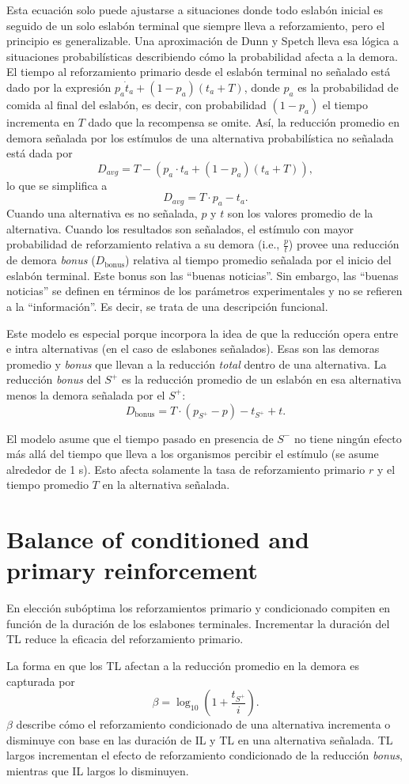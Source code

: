 \documentclass[a4paper,12pt]{article}
\begin{document}
Esta ecuación solo puede ajustarse a situaciones donde todo eslabón inicial es seguido de un solo eslabón terminal que siempre lleva a reforzamiento, pero el principio es generalizable.
Una aproximación de Dunn y Spetch lleva esa lógica a situaciones probabilísticas describiendo cómo la probabilidad afecta a la demora.
El tiempo al reforzamiento primario desde el eslabón terminal no señalado está dado por la expresión $p_{a} \dot t_{a} + (1 - p_{a})(t_{a} + T)$, donde $p_{a}$ es la probabilidad de comida al final del eslabón, es decir, con probabilidad $(1 - p_{a})$ el tiempo incrementa en $T$ dado que la recompensa se omite.
Así, la reducción promedio en demora señalada por los estímulos de una alternativa probabilística no señalada está dada por
\[
D_{avg} = T - (p_{a} \cdot t_{a} + (1 - p_{a})(t_{a} + T))
,\]
lo que se simplifica a
\[
D_{avg} = T \cdot p_{a} - t_{a}
.\]
Cuando una alternativa es no señalada, $p$ y $t$ son los valores promedio de la alternativa.
Cuando los resultados son señalados, el estímulo con mayor probabilidad de reforzamiento relativa a su demora (i.e., $\frac{p}{t}$) provee una reducción de demora {\itshape bonus} ($D_{\mbox{bonus}}$) relativa al tiempo promedio señalada por el inicio del eslabón terminal.
Este bonus son las ``buenas noticias''.
Sin embargo, las ``buenas noticias'' se definen en términos de los parámetros experimentales y no se refieren a la ``información''.
Es decir, se trata de una descripción funcional.

Este modelo es especial porque incorpora la idea de que la reducción opera entre e intra alternativas (en el caso de eslabones señalados).
Esas son las demoras promedio y {\itshape bonus} que llevan a la reducción {\itshape total} dentro de una alternativa.
La reducción {\itshape bonus} del $S^{+}$ es la reducción promedio de un eslabón en esa alternativa menos la demora señalada por el $S^{+}$:
\[
D_{\mbox{bonus}} = T \cdot (p_{S^{+}} - p) - t_{S^{+}} + t
.\]

El modelo asume que el tiempo pasado en presencia de $S^{-}$ no tiene ningún efecto más allá del tiempo que lleva a los organismos percibir el estímulo (se asume alrededor de 1 s).
Esto afecta solamente la tasa de reforzamiento primario $r$ y el tiempo promedio $T$ en la alternativa señalada.

\section{Balance of conditioned and primary reinforcement}

En elección subóptima los reforzamientos primario y condicionado compiten en función de la duración de los eslabones terminales.
Incrementar la duración del TL reduce la eficacia del reforzamiento primario.

La forma en que los TL afectan a la reducción promedio en la demora es capturada por
\[
\beta = \log_{10}\left(1 + \frac{t_{S^{+}}}{i}\right)
.\]
$\beta$ describe cómo el reforzamiento condicionado de una alternativa incrementa o disminuye con base en las duración de IL y TL en una alternativa señalada. TL largos incrementan el efecto de reforzamiento condicionado de la reducción {\itshape bonus}, mientras que IL largos lo disminuyen.
\end{document}
